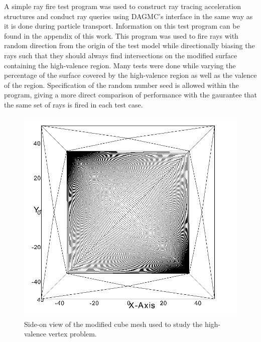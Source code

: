 \documentclass[12pt, a4paper]{article}
\begin{document}
A simple ray fire test program was used to construct ray tracing acceleration structures and conduct ray queries using DAGMC's interface in the same way as it is done during particle transport. Information on this test program can be found in the appendix of this work. This program was used to fire rays with random direction from the origin of the test model while directionally biasing the rays such that they should always find intersections on the modified surface containing the high-valence region. Many tests were done while varying the percentage of the surface covered by the high-valence region as well as the valence of the region. Specification of the random number seed is allowed within the program, giving a more direct comparison of performance with the gaurantee that the same set of rays is fired in each test case.

\begin{figure}[H]
  \centering
    \includegraphics[scale=0.33]{hv_study_design.png}
    \caption{Side-on view of the modified cube mesh used to study the high-valence vertex problem.}
    \label{hv_cube_design}
\end{figure}
\end{document}
